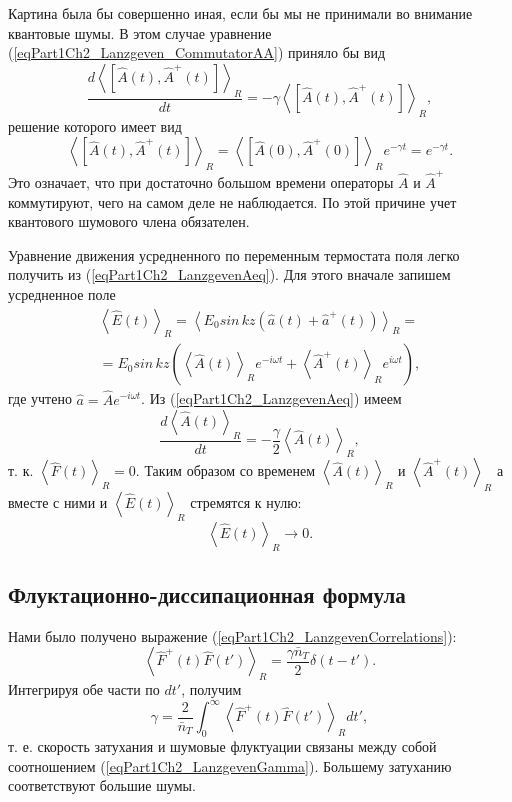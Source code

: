 Картина была бы совершенно иная, если бы мы не принимали во внимание
квантовые шумы. В этом случае уравнение
(\ref{eqPart1Ch2_Lanzgeven_CommutatorAA}) приняло бы вид
\begin{equation}
\frac{d \left<\left[\hat{A}\left(t\right),\hat{A}^{+}\left(t\right)\right]\right>_R}{d
t}=
- \gamma \left<\left[\hat{A}\left(t\right),\hat{A}^{+}\left(t\right)\right]\right>_R,
\nonumber
\end{equation}
решение которого имеет вид
\begin{equation}
\left<\left[\hat{A}\left(t\right),\hat{A}^{+}\left(t\right)\right]\right>_R
= 
\left<\left[\hat{A}\left(0\right),\hat{A}^{+}\left(0\right)\right]\right>_R
e^{- \gamma t}= e^{- \gamma t}.
\nonumber
\end{equation}
Это означает, что при достаточно большом времени операторы $\hat{A}$ и
$\hat{A}^{+}$ коммутируют, чего на самом деле не наблюдается. По этой
причине учет квантового шумового члена обязателен.


Уравнение движения усредненного по переменным термостата поля легко
получить из (\ref{eqPart1Ch2_LanzgevenAeq}). Для этого вначале запишем
усредненное поле
\begin{eqnarray}
\left<\hat{E}\left(t\right)\right>_R 
= \left< E_0 sin\,kz \left( \hat{a}\left(t\right) +
\hat{a}^{+}\left(t\right)\right)\right>_R  = 
\nonumber \\
= E_0 sin\,kz
\left(\left<\hat{A}\left(t\right)\right>_R e^{-i \omega t}
+
\left<\hat{A}^{+}\left(t\right)\right>_R e^{i \omega t}
\right),
\nonumber
\end{eqnarray}
где учтено $\hat{a} = \hat{A}e^{-i \omega t}$. Из
(\ref{eqPart1Ch2_LanzgevenAeq}) имеем 
\begin{equation}
\frac{d \left<\hat{A}\left(t\right)\right>_R}{d t} = 
- \frac{\gamma}{2} \left<\hat{A}\left(t\right)\right>_R,
\nonumber
\end{equation}
т. к. $\left<\hat{F}\left(t\right)\right>_R = 0$. Таким образом со
временем $\left<\hat{A}\left(t\right)\right>_R$ и
$\left<\hat{A}^{+}\left(t\right)\right>_R$ а вместе с ними и  
$\left<\hat{E}\left(t\right)\right>_R$ стремятся к нулю:
\begin{equation}
\left<\hat{E}\left(t\right)\right>_R \rightarrow 0.
\nonumber
\end{equation}

\subsection{Флуктационно-диссипационная формула}
Нами было получено выражение (\ref{eqPart1Ch2_LanzgevenCorrelations}):
\begin{equation}
\left<\hat{F}^{+}\left(t\right)\hat{F}\left(t'\right)\right>_R = 
\frac{\gamma \bar{n}_{T}}{2} \delta\left(t - t'\right).
\nonumber
\end{equation}
Интегрируя обе части по $d t'$, получим
\begin{equation}
\gamma =
\frac{2}{\bar{n}_T}\int_0^{\infty}\left<\hat{F}^{+}\left(t\right)\hat{F}\left(t'\right)\right>_R
d t',
\label{eqPart1Ch2_LanzgevenGamma}
\end{equation}
т. е. скорость затухания и шумовые флуктуации связаны между собой
соотношением (\ref{eqPart1Ch2_LanzgevenGamma}). Большему затуханию
соответствуют большие шумы.
